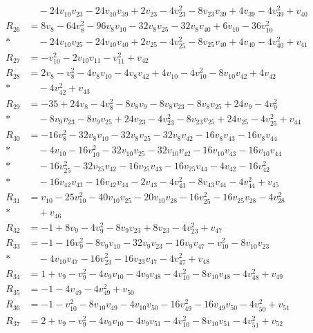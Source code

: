 \begin{align*}
&\quad-24v_{10}v_{23}-24v_{10}v_{39}+2v_{23}-4v_{23}^{2}-8v_{23}v_{39}+4v_{39}-4v_{39}^{2}+v_{40}\\[2pt]
R_{26}&=8v_{8}-64v_{8}^{2}-96v_{8}v_{10}-32v_{8}v_{25}-32v_{8}v_{40}+6v_{10}-36v_{10}^{2}\\*
&\quad-24v_{10}v_{25}-24v_{10}v_{40}+2v_{25}-4v_{25}^{2}-8v_{25}v_{40}+4v_{40}-4v_{40}^{2}+v_{41}\\[2pt]
R_{27}&=-v_{10}^{2}-2v_{10}v_{11}-v_{11}^{2}+v_{42}\\[2pt]
R_{28}&=2v_{8}-v_{8}^{2}-4v_{8}v_{10}-4v_{8}v_{42}+4v_{10}-4v_{10}^{2}-8v_{10}v_{42}+4v_{42}\\*
&\quad-4v_{42}^{2}+v_{43}\\[2pt]
R_{29}&=-35+24v_{8}-4v_{8}^{2}-8v_{8}v_{9}-8v_{8}v_{23}-8v_{8}v_{25}+24v_{9}-4v_{9}^{2}\\*
&\quad-8v_{9}v_{23}-8v_{9}v_{25}+24v_{23}-4v_{23}^{2}-8v_{23}v_{25}+24v_{25}-4v_{25}^{2}+v_{44}\\[2pt]
R_{30}&=-16v_{8}^{2}-32v_{8}v_{10}-32v_{8}v_{25}-32v_{8}v_{42}-16v_{8}v_{43}-16v_{8}v_{44}\\*
&\quad-4v_{10}-16v_{10}^{2}-32v_{10}v_{25}-32v_{10}v_{42}-16v_{10}v_{43}-16v_{10}v_{44}\\*
&\quad-16v_{25}^{2}-32v_{25}v_{42}-16v_{25}v_{43}-16v_{25}v_{44}-4v_{42}-16v_{42}^{2}\\*
&\quad-16v_{42}v_{43}-16v_{42}v_{44}-2v_{43}-4v_{43}^{2}-8v_{43}v_{44}-4v_{44}^{2}+v_{45}\\[2pt]
R_{31}&=v_{10}-25v_{10}^{2}-40v_{10}v_{25}-20v_{10}v_{28}-16v_{25}^{2}-16v_{25}v_{28}-4v_{28}^{2}\\*
&\quad+v_{46}\\[2pt]
R_{32}&=-1+8v_{9}-4v_{9}^{2}-8v_{9}v_{23}+8v_{23}-4v_{23}^{2}+v_{47}\\[2pt]
R_{33}&=-1-16v_{9}^{2}-8v_{9}v_{10}-32v_{9}v_{23}-16v_{9}v_{47}-v_{10}^{2}-8v_{10}v_{23}\\*
&\quad-4v_{10}v_{47}-16v_{23}^{2}-16v_{23}v_{47}-4v_{47}^{2}+v_{48}\\[2pt]
R_{34}&=1+v_{9}-v_{9}^{2}-4v_{9}v_{10}-4v_{9}v_{48}-4v_{10}^{2}-8v_{10}v_{48}-4v_{48}^{2}+v_{49}\\[2pt]
R_{35}&=-1-4v_{49}-4v_{49}^{2}+v_{50}\\[2pt]
R_{36}&=-1-v_{10}^{2}-8v_{10}v_{49}-4v_{10}v_{50}-16v_{49}^{2}-16v_{49}v_{50}-4v_{50}^{2}+v_{51}\\[2pt]
R_{37}&=2+v_{9}-v_{9}^{2}-4v_{9}v_{10}-4v_{9}v_{51}-4v_{10}^{2}-8v_{10}v_{51}-4v_{51}^{2}+v_{52}\\[2pt]

\end{align*}
